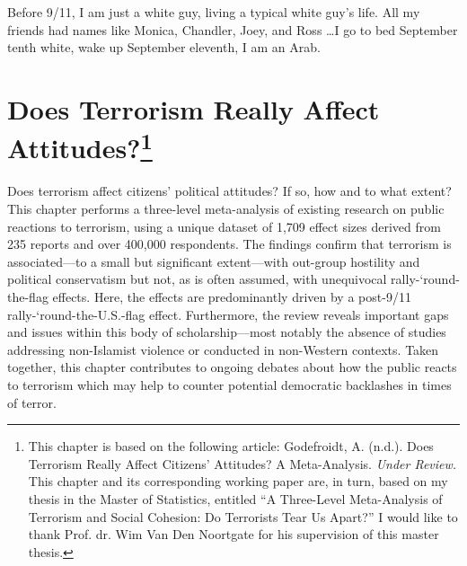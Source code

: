 \begin{savequote}[9cm]

Before 9/11, I am just a white guy, living a typical white guy's life. All my friends had names like Monica, Chandler, Joey, and Ross \dots I go to bed September tenth white, wake up September eleventh, I am an Arab.
\end{savequote}


\chapter[Does Terrorism Really Affect Attitudes?]{Does Terrorism Really Affect Attitudes?\footnote{This chapter is based on the following article:  Godefroidt, A. (n.d.). Does Terrorism Really Affect Citizens' Attitudes? A Meta-Analysis. \textit{Under Review.} This chapter and its corresponding working paper are, in turn, based on my thesis in the Master of Statistics, entitled ``A Three-Level Meta-Analysis of Terrorism and Social Cohesion: Do Terrorists Tear Us Apart?'' I would like to thank Prof. dr. Wim Van Den Noortgate for his supervision of this master thesis.}}
\label{chap:chap5}


\begin{chapabstract}
Does terrorism affect citizens’ political attitudes? If so, how and to what extent? This chapter performs a three-level meta-analysis of existing research on public reactions to terrorism, using a unique dataset of 1,709 effect sizes derived from 235 reports and over 400,000 respondents. The findings confirm that terrorism is associated—to a small but significant extent—with out-group hostility and political conservatism but not, as is often assumed, with unequivocal rally-‘round-the-flag effects. Here, the effects are predominantly driven by a post-9/11 rally-‘round-the-U.S.-flag effect. Furthermore, the review reveals important gaps and issues within this body of scholarship—most notably the absence of studies addressing non-Islamist violence or conducted in non-Western contexts. Taken together, this chapter contributes to ongoing debates about how the public reacts to terrorism which may help to counter potential democratic backlashes in times of terror.
\end{chapabstract}


